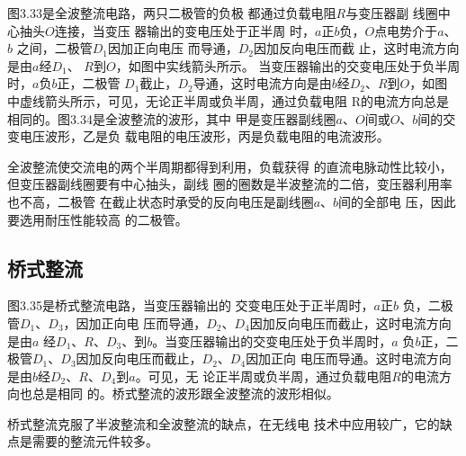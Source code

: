 图3.33是全波整流电路，两只二极管的负极
都通过负载电阻$R$与变压器副
线圈中心抽头$O$连接，当变压
器输出的变电压处于正半周
时，$a$正$b$负，$O$点电势介于$a$、$b$
之间，二极管$D_1$因加正向电压
而导通，$D_2$因加反向电压而截
止，这时电流方向是由$a$经$D_1$、
$R$到$O$，如图中实线箭头所示。
当变压器输出的交变电压处于负半周时，$a$负$b$正，二极管
$D_1$截止，$D_2$导通，这时电流方向是由$b$经$D_2$、$R$到$O$，如图
中虚线箭头所示，可见，无论正半周或负半周，通过负载电阻
R的电流方向总是相同的。图3.34是全波整流的波形，其中
甲是变压器副线圈$a$、$O$间或$O$、$b$间的交变电压波形，乙是负
载电阻的电压波形，丙是负载电阻的电流波形。

全波整流使交流电的两个半周期都得到利用，负载获得
的直流电脉动性比较小，但变压器副线圈要有中心抽头，副线
圈的圈数是半波整流的二倍，变压器利用率也不高，二极管
在截止状态时承受的反向电压是副线圈$a$、$b$间的全部电
压，因此要选用耐压性能较高
的二极管。

\subsection{桥式整流}

图3.35是桥式整流电路，当变压器输出的
交变电压处于正半周时，$a$正$b$
负，二极管$D_1$、$D_3$，因加正向电
压而导通，$D_2$、$D_4$因加反向电压而截止，这时电流方向是由$a$
经$D_1$、$R$、$D_3$、到$b$。当变压器输出的交变电压处于负半周时，$a$
负$b$正，二极管$D_1$、$D_3$因加反向电压而截止，$D_2$、$D_4$因加正向
电压而导通。这时电流方向是由$b$经$D_2$、$R$、$D_4$到$a$。可见，无
论正半周或负半周，通过负载电阻$R$的电流方向也总是相同
的。桥式整流的波形跟全波整流的波形相似。

桥式整流克服了半波整流和全波整流的缺点，在无线电
技术中应用较广，它的缺点是需要的整流元件较多。


